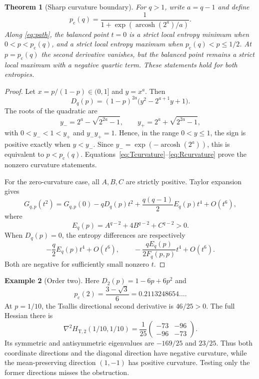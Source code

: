 \documentclass[11pt]{article}
\numberwithin{equation}{section}
\newtheorem{theorem}{Theorem}[section]
\theoremstyle{definition}
\newtheorem{example}[theorem]{Example}
\theoremstyle{remark}
\newcommand{\pc}{p_{\mathrm c}}
\newcommand{\arcosh}{\operatorname{arcosh}}
\begin{document}
\begin{theorem}[Sharp curvature boundary]\label{thm:curvature}
For $q>1$, write $a=q-1$ and define
\begin{equation}
 \pc(q)=\frac{1}{1+\exp\!\left(\arcosh(2^a)/a\right)}.
 \label{eq:pc}
\end{equation}
Along \eqref{eq:path}, the balanced point $t=0$ is a strict local entropy
minimum when $0<p<\pc(q)$, and a strict local entropy maximum when
$\pc(q)<p\leq1/2$. At $p=\pc(q)$ the second derivative vanishes, but the
balanced point remains a strict local maximum with a negative quartic term.
These statements hold for both entropies.
\end{theorem}
\begin{proof}
Let $x=p/(1-p)\in(0,1]$ and $y=x^a$. Then
\begin{equation}
 D_q(p)=(1-p)^{2a}\bigl(y^2-2^{a+1}y+1\bigr).
 \label{eq:Dfactor}
\end{equation}
The roots of the quadratic are
\[
 y_-=2^a-\sqrt{2^{2a}-1},\qquad
 y_+=2^a+\sqrt{2^{2a}-1},
\]
with $0<y_-<1<y_+$ and $y_-y_+=1$. Hence, in the range $0<y\leq1$,
the sign is positive exactly when $y<y_-$. Since
$y_-=\exp(-\arcosh(2^a))$, this is equivalent to $p<\pc(q)$.
Equations~\eqref{eq:Tcurvature}--\eqref{eq:Rcurvature} prove the nonzero
curvature statements.

For the zero-curvature case, all $A,B,C$ are strictly positive. Taylor
expansion gives
\begin{equation}
 G_{q,p}(t^2)=G_{q,p}(0)-qD_q(p)t^2
 +\frac{q(q-1)}2E_q(p)t^4+O(t^6),\label{eq:quartic}
\end{equation}
where
\[
 E_q(p)=A^{q-2}+4B^{q-2}+C^{q-2}>0.
\]
When $D_q(p)=0$, the entropy differences are respectively
\[
 -\frac q2E_q(p)t^4+O(t^6),\qquad
 -\frac{qE_q(p)}{2F_q(p,p)}t^4+O(t^6).
\]
Both are negative for sufficiently small nonzero $t$.
\end{proof}

\begin{example}[Order two]
Here $D_2(p)=1-6p+6p^2$ and
\begin{equation}
 \pc(2)=\frac{3-\sqrt3}{6}=0.2113248654\ldots.
\end{equation}
At $p=1/10$, the Tsallis directional second derivative is $46/25>0$.
The full Hessian there is
\begin{equation}
 \nabla^2H_{\mathrm T,2}(1/10,1/10)
 =\frac1{25}\begin{pmatrix}-73&-96\\-96&-73\end{pmatrix}.
 \label{eq:hessian}
\end{equation}
Its symmetric and antisymmetric eigenvalues are $-169/25$ and $23/25$.
Thus both coordinate directions and the diagonal direction have negative
curvature, while the mean-preserving direction $(1,-1)$ has positive
curvature. Testing only the former directions misses the obstruction.
\end{example}
\end{document}

